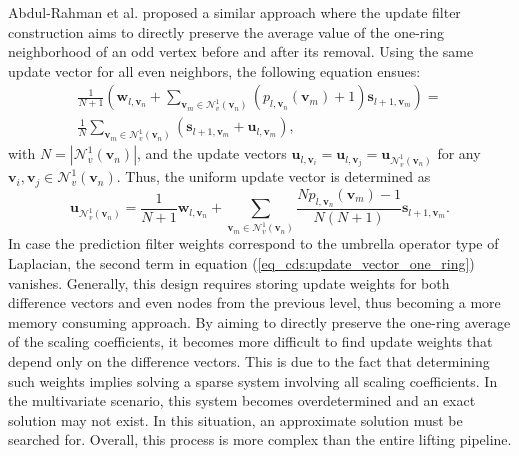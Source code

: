 \documentclass[graybox]{svmult}
\begin{document}
	Abdul-Rahman et al. \cite{AbdulRahman2013} proposed a similar approach where the update filter construction aims to directly preserve the average value of the one-ring neighborhood of an odd vertex before and after its removal. Using the same update vector for all even neighbors, the following equation ensues:
	\begin{eqnarray}
	\frac{1}{ N + 1} \left( \mathbf{w}_{l, \mathbf{v}_n} + \sum\limits_{\mathbf{v}_m \in \mathcal{N}_v^1(\mathbf{v}_n) } { (  p_{l, \mathbf{v}_n}(\mathbf{v}_m) + 1 ) \mathbf{s}_{l+1, \mathbf{v}_m} } \right) = \\ \frac{1}{N} \sum\limits_{\mathbf{v}_m \in \mathcal{N}_v^1(\mathbf{v}_n) } { (  \mathbf{s}_{l+1, \mathbf{v}_m} + \mathbf{u}_{l,\mathbf{v}_m} ) } ,
	\label{eq_cds:one_ring_average}
	\end{eqnarray}
	with $N = | \mathcal{N}_v^1(\mathbf{v}_n) |$, and the update vectors $\mathbf{u}_{l,\mathbf{v}_i} = \mathbf{u}_{l,\mathbf{v}_j} = \mathbf{u}_{\mathcal{N}_v^1(\mathbf{v}_n)} $ for any $\mathbf{v}_i, \mathbf{v}_j \in \mathcal{N}_v^1(\mathbf{v}_n)$. Thus, the uniform update vector is determined as
	\begin{equation}
	\mathbf{ u}_{\mathcal{N}_v^1(\mathbf{v}_n)} = \frac{1}{N + 1} \mathbf{w}_{l, \mathbf{v}_n}  + \sum\limits_{\mathbf{v}_m \in \mathcal{N}_v^1(\mathbf{v}_n) } { \frac{ N  p_{l, \mathbf{v}_n}(\mathbf{v}_m) - 1 }{N (N +1 ) } \mathbf{s}_{l+1, \mathbf{v}_m} }.
	\label{eq_cds:update_vector_one_ring}
	\end{equation}
	In case the prediction filter weights correspond to the umbrella operator type of Laplacian, the second term in equation (\ref{eq_cds:update_vector_one_ring}) vanishes. Generally, this design requires storing update weights for both difference vectors and even nodes from the previous level, thus becoming a more memory consuming approach.
	By aiming to directly preserve the one-ring average of the scaling coefficients, it becomes more difficult to find update weights that depend only on the difference vectors. This is due to the fact that determining such weights implies solving a sparse system involving all scaling coefficients. In the multivariate scenario, this system becomes overdetermined and an exact solution may not exist. In this situation, an approximate solution must be searched for. Overall, this  process is more complex than the entire lifting pipeline.
	
\end{document}
